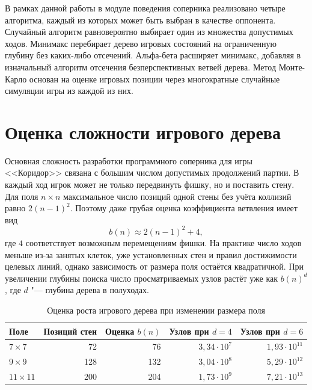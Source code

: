 \documentclass[a4paper,12pt]{diplom}
\begin{document}
В рамках данной работы в модуле поведения соперника реализовано четыре алгоритма, каждый из которых может быть выбран в качестве оппонента. Случайный алгоритм равновероятно выбирает один из множества допустимых ходов. Минимакс перебирает дерево игровых состояний на ограниченную глубину без каких-либо отсечений. Альфа-бета расширяет минимакс, добавляя в изначальный алгоритм отсечения безперспективных ветвей дерева. Метод Монте-Карло основан на оценке игровых позиции через многократные случайные симуляции игры из каждой из них.

\section{Оценка сложности игрового дерева}

Основная сложность разработки программного соперника для игры <<Коридор>> связана с большим числом допустимых продолжений партии. В каждый ход игрок может не только передвинуть фишку, но и поставить стену. Для поля $n \times n$ максимальное число позиций одной стены без учёта коллизий равно $2(n-1)^2$. Поэтому даже грубая оценка коэффициента ветвления имеет вид
\[
    b(n) \approx 2(n-1)^2 + 4,
\]
где $4$ соответствует возможным перемещениям фишки. На практике число ходов меньше из-за занятых клеток, уже установленных стен и правил достижимости целевых линий, однако зависимость от размера поля остаётся квадратичной. При увеличении глубины поиска число просматриваемых узлов растёт уже как $b(n)^d$, где $d$ "--- глубина дерева в полуходах.

\begin{table}[H]
    \centering
    \caption{Оценка роста игрового дерева при изменении размера поля}
    \label{tab:tree_complexity_by_size}
    \begin{tabular}{lrrrr}
        \toprule
        Поле & Позиций стен & Оценка $b(n)$ & Узлов при $d=4$ & Узлов при $d=6$ \\
        \midrule
        $7 \times 7$   & 72  & 76  & $3{,}34 \cdot 10^7$  & $1{,}93 \cdot 10^{11}$ \\
        $9 \times 9$   & 128 & 132 & $3{,}04 \cdot 10^8$  & $5{,}29 \cdot 10^{12}$ \\
        $11 \times 11$ & 200 & 204 & $1{,}73 \cdot 10^9$  & $7{,}21 \cdot 10^{13}$ \\
        \bottomrule
    \end{tabular}
\end{table}
\end{document}
